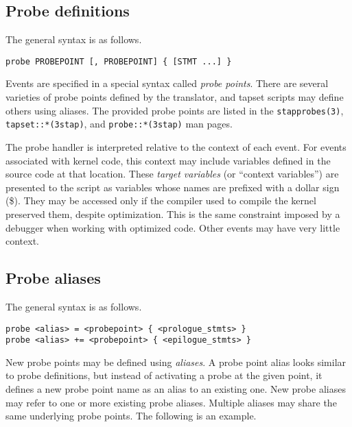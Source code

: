 \documentclass[twoside,english]{article}
\newenvironment{vindent}
{\begin{list}{}{\setlength{\listparindent}{6pt}}
\item[]}
{\end{list}}
\begin{document}
\subsection{Probe definitions}

The general syntax is as follows.

\begin{vindent}
\begin{verbatim}
probe PROBEPOINT [, PROBEPOINT] { [STMT ...] }
\end{verbatim}
\end{vindent}
Events are specified in a special syntax called \emph{probe points}. There
are several varieties of probe points defined by the translator, and tapset
scripts may define others using aliases. The provided probe points are listed
in the \texttt{stapprobes(3)}, \texttt{tapset::*(3stap)}, and
\texttt{probe::*(3stap)} man pages.

The probe handler is interpreted relative to the context of each event. For
events associated with kernel code, this context may include variables defined
in the source code at that location. These \emph{target variables} (or ``context variables'')
are presented to the script as variables whose names are prefixed with a
dollar sign (\$). They may be accessed only if the compiler used to compile
the kernel preserved them, despite optimization. This is the same constraint
imposed by a debugger when working with optimized code. Other events may
have very little context.


\subsection{Probe aliases\label{sub:Probe-aliases}}
The general syntax is as follows.

\begin{vindent}
\begin{verbatim}
probe <alias> = <probepoint> { <prologue_stmts> }
probe <alias> += <probepoint> { <epilogue_stmts> }
\end{verbatim}
\end{vindent}

New probe points may be defined using \emph{aliases}. A probe point alias
looks similar to probe definitions, but instead of activating a probe at
the given point, it defines a new probe point name as an alias to an existing
one. New probe aliases may refer to one or more existing probe aliases.
Multiple aliases may share the same underlying probe points.
The following is an example.
\end{document}

